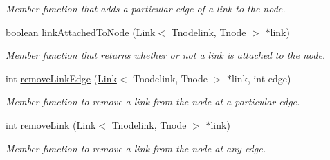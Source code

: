 \begin{DoxyCompactItemize}
\begin{DoxyCompactList}\small\item\em Member function that adds a particular edge of a link to the node. \end{DoxyCompactList}\item 
boolean \hyperlink{classNode_a9237bd16a22ee02c244d8cc95d6533bd}{link\-Attached\-To\-Node} (\hyperlink{classLink}{Link}$<$ Tnodelink, Tnode $>$ $\ast$link)
\begin{DoxyCompactList}\small\item\em Member function that returns whether or not a link is attached to the node. \end{DoxyCompactList}\item 
\hypertarget{classNode_ad469f4b48294f360d372b5765eee4f77}{int \hyperlink{classNode_ad469f4b48294f360d372b5765eee4f77}{remove\-Link\-Edge} (\hyperlink{classLink}{Link}$<$ Tnodelink, Tnode $>$ $\ast$link, int edge)}\label{classNode_ad469f4b48294f360d372b5765eee4f77}

\begin{DoxyCompactList}\small\item\em Member function to remove a link from the node at a particular edge. \end{DoxyCompactList}\item 
int \hyperlink{classNode_aa7a762ea839eea52e9d2cae7f31780e8}{remove\-Link} (\hyperlink{classLink}{Link}$<$ Tnodelink, Tnode $>$ $\ast$link)
\begin{DoxyCompactList}\small\item\em Member function to remove a link from the node at any edge. \end{DoxyCompactList}\end{DoxyCompactItemize}
